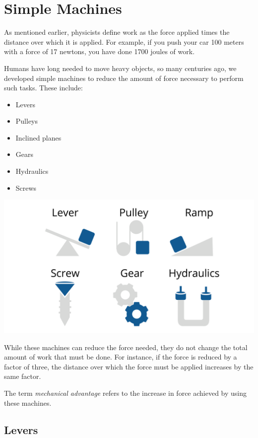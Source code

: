 \chapter{Simple Machines}

As mentioned earlier, physicists define work as the force applied times the distance over which it is applied. For example, if you push your car 100 meters with a force of 17 newtons, you have done 1700 joules of work.

Humans have long needed to move heavy objects, so many centuries ago, we developed simple machines to reduce the amount of force necessary to perform such tasks. These include:

\begin{itemize}
    \item Levers
    \item Pulleys
    \item Inclined planes
    \item Gears
    \item Hydraulics
    \item Screws
\end{itemize}

\includegraphics[width=\textwidth]{simplemachines.png}

While these machines can reduce the force needed, they do not change the total amount of work that must be done. For instance, if the force is reduced by a factor of three, the distance over which the force must be applied increases by the same factor.

The term \textit{mechanical advantage} refers to the increase in force achieved by using these machines.

\section{Levers}

